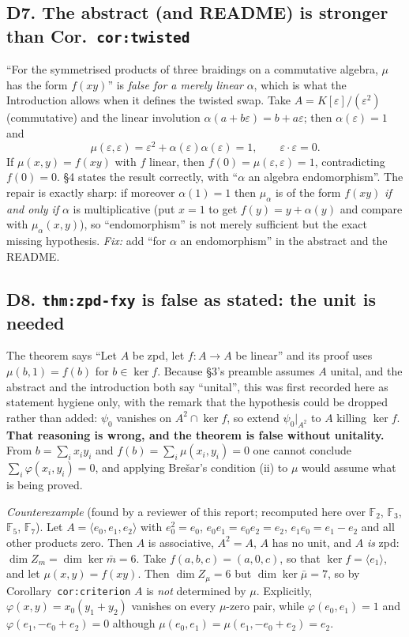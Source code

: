 \documentclass[11pt,a4paper]{article}
\newcommand{\cpt}[1]{\texttt{#1}}          %
\begin{document}
\subsection*{D7. The abstract (and README) is stronger than Cor.~\cpt{cor:twisted}}
``For the symmetrised products of three braidings on a commutative algebra, $\mu$ has the form $f(xy)$''
is \emph{false for a merely linear} $\alpha$, which is what the Introduction allows when it defines the
twisted swap. Take $A=K[\varepsilon]/(\varepsilon^2)$ (commutative) and the linear involution
$\alpha(a+b\varepsilon)=b+a\varepsilon$; then $\alpha(\varepsilon)=1$ and
\[
\mu(\varepsilon,\varepsilon)=\varepsilon^2+\alpha(\varepsilon)\alpha(\varepsilon)=1,
\qquad \varepsilon\cdot\varepsilon=0 .
\]
If $\mu(x,y)=f(xy)$ with $f$ linear, then $f(0)=\mu(\varepsilon,\varepsilon)=1$, contradicting
$f(0)=0$. \S4 states the result correctly, with ``$\alpha$ an algebra endomorphism''.
The repair is exactly sharp: if moreover $\alpha(1)=1$ then $\mu_\alpha$ is of the form $f(xy)$
\emph{if and only if} $\alpha$ is multiplicative (put $x=1$ to get $f(y)=y+\alpha(y)$ and compare with
$\mu_\alpha(x,y)$), so ``endomorphism'' is not merely sufficient but the exact missing hypothesis.
\emph{Fix:} add ``for $\alpha$ an endomorphism'' in the abstract and the README.

\subsection*{D8. \cpt{thm:zpd-fxy} is false as stated: the unit is needed}
The theorem says ``Let $A$ be zpd, let $f\colon A\to A$ be linear'' and its proof uses $\mu(b,1)=f(b)$
for $b\in\ker f$. Because \S3's preamble assumes $A$ unital, and the abstract and the introduction both
say ``unital'', this was first recorded here as statement hygiene only, with the remark that the
hypothesis could be dropped rather than added: $\psi_0$ vanishes on $A^2\cap\ker f$, so extend
$\psi_0|_{A^2}$ to $A$ killing $\ker f$. \textbf{That reasoning is wrong, and the theorem is false
without unitality.} From $b=\sum_i x_i y_i$ and $f(b)=\sum_i\mu(x_i,y_i)=0$ one cannot conclude
$\sum_i\varphi(x_i,y_i)=0$, and applying Bre\v{s}ar's condition (ii) to $\mu$ would assume what is being
proved.

\emph{Counterexample} (found by a reviewer of this report; recomputed here over $\mathbb{F}_2$,
$\mathbb{F}_3$, $\mathbb{F}_5$, $\mathbb{F}_7$). Let $A=\langle e_0,e_1,e_2\rangle$ with
$e_0^2=e_0$, $e_0e_1=e_0e_2=e_2$, $e_1e_0=e_1-e_2$ and all other products zero. Then $A$ is
associative, $A^2=A$, $A$ has no unit, and $A$ \emph{is} zpd: $\dim Z_m=\dim\ker\bar m=6$. Take
$f(a,b,c)=(a,0,c)$, so that $\ker f=\langle e_1\rangle$, and let $\mu(x,y)=f(xy)$. Then
$\dim Z_\mu=6$ but $\dim\ker\bar\mu=7$, so by Corollary~\cpt{cor:criterion} $A$ is \emph{not} determined
by $\mu$. Explicitly, $\varphi(x,y)=x_0(y_1+y_2)$ vanishes on every $\mu$-zero pair, while
$\varphi(e_0,e_1)=1$ and $\varphi(e_1,-e_0+e_2)=0$ although $\mu(e_0,e_1)=\mu(e_1,-e_0+e_2)=e_2$.
\end{document}
